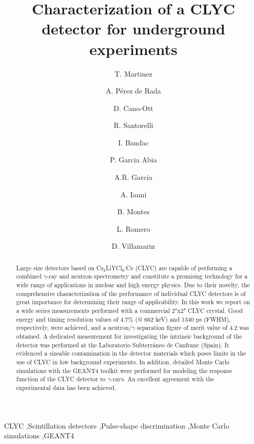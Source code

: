 \documentclass[review,number,sort&compress]{elsarticle}
\begin{document}
\begin{frontmatter}

\title{Characterization of a CLYC detector for underground experiments}

\author[ciemat]{T. Martinez }
\author[ciemat]{A. P\'{e}rez de Rada}
\author[ciemat]{D. Cano-Ott}
\author[ciemat]{R. Santorelli}
\author[lsc]{I. Bandac}
\author[ciemat]{P. Garcia Abia}
\author[ciemat]{A.R. Garcia}
\author[lsc]{A. Ianni}
\author[ciemat]{B. Montes}
\author[ciemat]{L. Romero}
\author[ciemat]{D. Villamarin}


\address[ciemat]{Centro de Investigaciones Energ\'{e}ticas, Medioambientales y Tecnol\'{o}gicas (CIEMAT), Avenida Complutense 40, Madrid 28040, Spain}
\address[lsc]{Laboratorio Subterr\'{a}neo de Canfranc (LSC), Paseo de los Ayerbes s/n, Canfranc-Estaci\'{o}n 22880, Spain}


\begin{abstract}

Large size detectors based on Cs$_{2}$LiYCl$_{6}$:Ce (CLYC) are capable of performing a combined $\gamma$-ray and neutron spectrometry and constitute a promising technology for a wide range of applications in nuclear and high energy physics. Due to their novelty, the comprehensive characterization of the performance of individual CLYC detectors is of great importance for determining their range of applicability. In this work we report on a wide series measurements performed with a commercial 2"x2" CLYC crystal. Good energy and timing resolution values of 4.7$\%$ (@ 662 keV) and 1340 ps (FWHM), respectively, were achieved, and a neutron/$\gamma$ separation figure of merit value of 4.2 was obtained. A dedicated measurement for investigating the intrinsic background of the detector was performed at the Laboratorio Subterr\'{a}neo de Canfranc (Spain). It evidenced a sizeable contamination in the detector materials which poses limits in the use of CLYC in low background experiments. In addition, detailed Monte Carlo simulations with the GEANT4 toolkit were performed for modeling the response function of the CLYC detector to $\gamma$-rays. An excellent agreement with the experimental data has been achieved.
\end{abstract}

\begin{keyword}
CLYC \sep Scintillation detectors \sep Pulse-shape discrimination \sep Monte Carlo simulations \sep GEANT4
\end{keyword}

\end{frontmatter}
\end{document}
